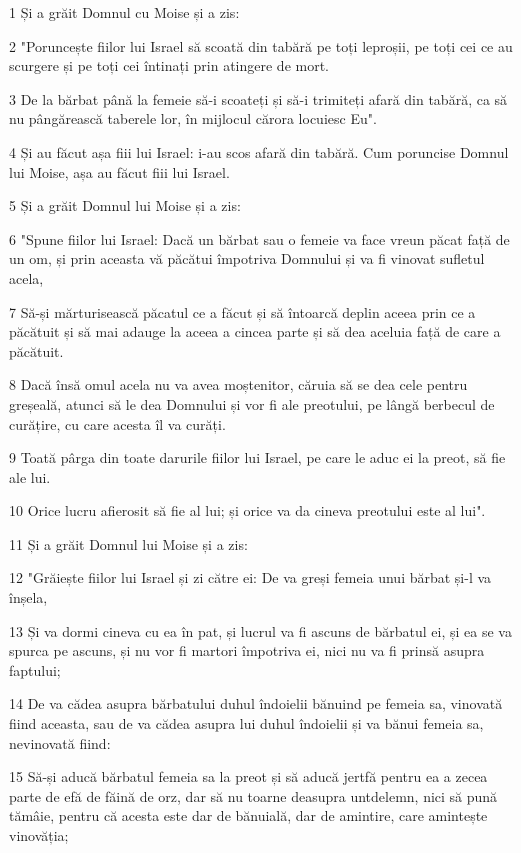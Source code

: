 \par 1 Și a grăit Domnul cu Moise și a zis:
\par 2 "Poruncește fiilor lui Israel să scoată din tabără pe toți leproșii, pe toți cei ce au scurgere și pe toți cei întinați prin atingere de mort.
\par 3 De la bărbat până la femeie să-i scoateți și să-i trimiteți afară din tabără, ca să nu pângărească taberele lor, în mijlocul cărora locuiesc Eu".
\par 4 Și au făcut așa fiii lui Israel: i-au scos afară din tabără. Cum poruncise Domnul lui Moise, așa au făcut fiii lui Israel.
\par 5 Și a grăit Domnul lui Moise și a zis:
\par 6 "Spune fiilor lui Israel: Dacă un bărbat sau o femeie va face vreun păcat față de un om, și prin aceasta vă păcătui împotriva Domnului și va fi vinovat sufletul acela,
\par 7 Să-și mărturisească păcatul ce a făcut și să întoarcă deplin aceea prin ce a păcătuit și să mai adauge la aceea a cincea parte și să dea aceluia față de care a păcătuit.
\par 8 Dacă însă omul acela nu va avea moștenitor, căruia să se dea cele pentru greșeală, atunci să le dea Domnului și vor fi ale preotului, pe lângă berbecul de curățire, cu care acesta îl va curăți.
\par 9 Toată pârga din toate darurile fiilor lui Israel, pe care le aduc ei la preot, să fie ale lui.
\par 10 Orice lucru afierosit să fie al lui; și orice va da cineva preotului este al lui".
\par 11 Și a grăit Domnul lui Moise și a zis:
\par 12 "Grăiește fiilor lui Israel și zi către ei: De va greși femeia unui bărbat și-l va înșela,
\par 13 Și va dormi cineva cu ea în pat, și lucrul va fi ascuns de bărbatul ei, și ea se va spurca pe ascuns, și nu vor fi martori împotriva ei, nici nu va fi prinsă asupra faptului;
\par 14 De va cădea asupra bărbatului duhul îndoielii bănuind pe femeia sa, vinovată fiind aceasta, sau de va cădea asupra lui duhul îndoielii și va bănui femeia sa, nevinovată fiind:
\par 15 Să-și aducă bărbatul femeia sa la preot și să aducă jertfă pentru ea a zecea parte de efă de făină de orz, dar să nu toarne deasupra untdelemn, nici să pună tămâie, pentru că acesta este dar de bănuială, dar de amintire, care amintește vinovăția;
